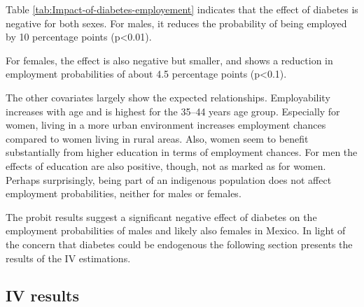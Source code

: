 \begin{table}[hp]
\begin{center}
\begin{adjustbox}{max width=\textwidth, center}
\begin{threeparttable}
  &     8243         &         \\ \bottomrule {} \\ \\ \end{tabular}
}
\end{threeparttable}
\end{adjustbox}
\end{center}
\end{table}

Table \ref{tab:Impact-of-diabetes-employement} indicates
that the effect of diabetes is negative for both sexes. For males,
it reduces the probability of being employed by 10 percentage points
(p<0.01).


For females, the effect is also negative but smaller, and
shows a reduction in employment probabilities of about 4.5 percentage
points (p<0.1).




The other covariates largely show the expected relationships.
Employability increases with age and is highest for the 35--44 years
age group. Especially for women, living in a more urban environment
increases employment chances compared to women living in rural areas.
Also, women seem to benefit substantially from higher education in
terms of employment chances. For men the effects of education are
also positive, though, not as marked as for women. Perhaps surprisingly,
being part of an indigenous population does not affect employment
probabilities, neither for males or females. 

The probit results suggest a significant negative effect
of diabetes on the employment probabilities of males and likely also
females in Mexico. In light of the concern that diabetes could be
endogenous the following section presents the results of the \ac{IV}
estimations. 
\FloatBarrier

\subsection{\label{sub:Bivariate-probit}IV results}



